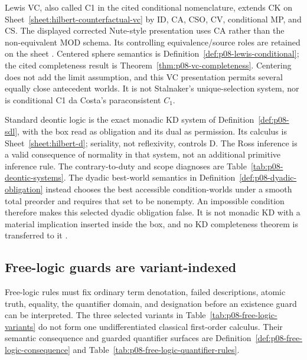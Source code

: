 Lewis VC, also called C1 in the cited conditional nomenclature, extends CK
on Sheet~\ref{sheet:hilbert-counterfactual-vc} by ID, CA, CSO, CV,
conditional MP, and CS.  The displayed corrected Nute-style presentation
uses CA rather than the non-equivalent MOD schema.  Its controlling
equivalence/source roles are retained on the sheet
\cite{Lewis1971,Lewis1973,Wen2019}.  Centered sphere semantics is
Definition~\ref{def:p08-lewis-conditional}; the cited completeness result is
Theorem~\ref{thm:p08-vc-completeness}.  Centering does not add the limit
assumption, and this VC presentation permits several equally close
antecedent worlds.  It is not Stalnaker's unique-selection system, nor is
conditional C1 da Costa's paraconsistent \(C_1\).

Standard deontic logic is the exact monadic KD system of
Definition~\ref{def:p08-sdl}, with the box read as obligation and its dual
as permission.  Its calculus is Sheet~\ref{sheet:hilbert-d}; seriality,
not reflexivity, controls D.  The Ross inference is a valid consequence
of normality in that system, not an additional primitive inference rule.
The contrary-to-duty and scope diagnoses are
Table~\ref{tab:p08-deontic-systems}.  The dyadic best-world semantics in
Definition~\ref{def:p08-dyadic-obligation} instead chooses the best accessible
condition-worlds under a smooth total preorder and requires that set to be
nonempty.  An impossible condition therefore makes this selected dyadic
obligation false.  It is not monadic KD with a material implication inserted
inside the box, and no KD completeness theorem is transferred to it
\cite{Hansson1969,McNamara2006}.


\subsection{Free-logic guards are variant-indexed}

Free-logic rules must fix ordinary term denotation, failed descriptions,
atomic truth, equality, the quantifier domain, and designation before an
existence guard can be interpreted.  The three selected variants in
Table~\ref{tab:p08-free-logic-variants} do not form one undifferentiated
classical first-order calculus.  Their semantic consequence and guarded
quantifier surfaces are Definition~\ref{def:p08-free-logic-consequence} and
Table~\ref{tab:p08-free-logic-quantifier-rules}.

